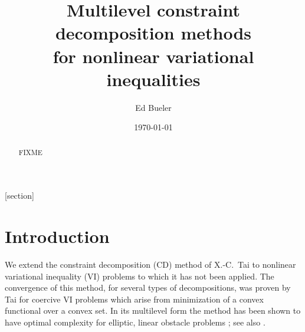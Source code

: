 \documentclass[letterpaper,final,12pt,reqno]{amsart}
\theoremstyle{cstyle}
\theoremstyle{cstyle*}
\theoremstyle{dstyle}
\numberwithin{equation}{section}
\numberwithin{figure}{section}
\numberwithin{table}{section}
\numberwithin{theorem}{section}
\begin{document}
\title[Multilevel constraint decomposition methods]{Multilevel constraint decomposition methods \\ for nonlinear variational inequalities}

\author{Ed Bueler}

\date{\today}

\begin{abstract} FIXME
\end{abstract}

\maketitle


\thispagestyle{empty}

[section]


\section{Introduction} \label{sec:intro}

We extend the constraint decomposition (CD) method of X.-C.~Tai \cite{Tai2003} to nonlinear variational inequality (VI) problems to which it has not been applied.  The convergence of this method, for several types of decompositions, was proven by Tai for coercive VI problems which arise from minimization of a convex functional over a convex set.  In its multilevel form the method has been shown to have optimal complexity for elliptic, linear obstacle problems \cite[Subsection 5.4]{Tai2003}; see also \cite[Theorem 4.6 and Algorithm 4.7]{GraeserKornhuber2009}.
\end{document}
